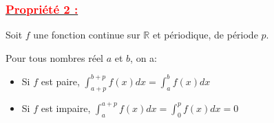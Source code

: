 \documentclass[12pt]{article}
\begin{document}
\subsubsection*{\underline{\textcolor{red}{Propriété 2 :}}}
Soit \(f\) une fonction continue sur \( \mathbb{R} \) et périodique, de période \(p\).

Pour tous nombres réel \(a\) et \(b\), on a:

\begin{itemize}
    \item Si \(f\) est paire, \( \int_{a+p}^{b+p}f(x)dx = \int_{a}^{b}f(x)dx \)
    \item Si \(f\) est impaire, \( \int_{a}^{a+p}f(x)dx =  \int_{0}^{p}f(x)dx = 0 \)
\end{itemize}
\end{document}
